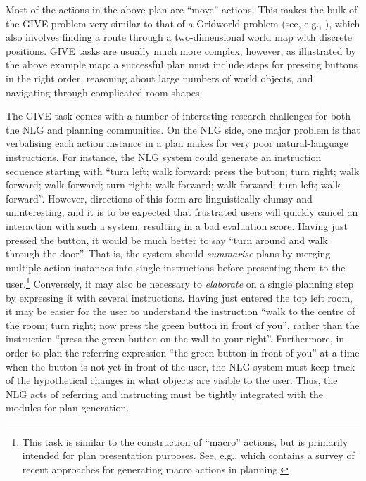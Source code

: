 \documentclass[letterpaper]{article}
\begin{document}
Most of the actions in the above plan are ``move'' actions. This makes the
bulk of the GIVE problem very similar to that of a Gridworld problem (see,
e.g., \citep{Tovey-Koenig:2000}), which also involves finding a route
through a two-dimensional world map with discrete positions. GIVE tasks are
usually much more complex, however, as illustrated by the above example
map: a successful plan must include steps for pressing buttons in the right
order, reasoning about large numbers of world objects, and navigating
through complicated room shapes.

The GIVE task comes with a number of interesting research challenges for
both the NLG and planning communities. On the NLG side, one major problem
is that verbalising each action instance in a plan makes for very
poor natural-language instructions. For instance, the NLG system could
generate an instruction sequence starting with ``turn left; walk forward;
press the button; turn right; walk forward; walk forward; turn right; walk
forward; walk forward; turn left; walk forward''. However, directions of
this form are linguistically clumsy and uninteresting, and it is to be
expected that frustrated users will quickly cancel an interaction with such
a system, resulting in a bad evaluation score. Having just pressed the
button, it would be much better to say ``turn around and walk through the
door''. That is, the system should \emph{summarise} plans by merging
multiple action instances into single instructions before presenting them
to the user.\footnote{This task is similar to the construction of
  ``macro'' actions, but is primarily intended for plan presentation
  purposes. See, e.g., \citep{Botea-etal:05} which contains a survey of
  recent approaches for generating macro actions in planning.}
Conversely, it may also be necessary to \emph{elaborate} on a single
planning step by expressing it with several instructions. Having just
entered the top left room, it may be easier for the user to understand the
instruction ``walk to the centre of the room; turn right; now press the
green button in front of you'', rather than the instruction ``press the
green button on the wall to your right''. Furthermore, in order to plan the
referring expression ``the green button in front of you'' at a time when
the button is not yet in front of the user, the NLG system must keep track
of the hypothetical changes in what objects are visible to the user. Thus,
the NLG acts of referring and instructing must be tightly integrated with
the modules for plan generation.
\end{document}
